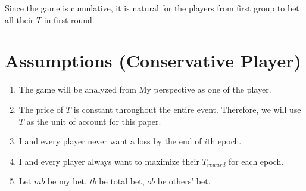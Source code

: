 \documentclass{article}
\begin{document}
Since the game is cumulative, it is natural for the players from first group to bet all their $T$ in first round. 





























































\section*{Assumptions (Conservative Player)}
\begin{enumerate}
    \item The game will be analyzed from My perspective as one of the player.
    
    \item The price of $T$ is constant throughout the entire event. 
    Therefore, we will use $T$ as the unit of account for this paper.

    \item I and every player never want a loss by the end of $i$th epoch.
    
    \item I and every player always want to maximize their $T_{reward}$ for each epoch.
    
    \item Let $mb$ be my bet, $tb$ be total bet, $ob$ be others' bet.
\end{enumerate}
\end{document}
